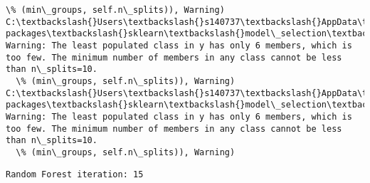 \documentclass[11pt]{article}
\begin{document}
\begin{Verbatim}[commandchars=\\\{\}]
  \% (min\_groups, self.n\_splits)), Warning)
C:\textbackslash{}Users\textbackslash{}s140737\textbackslash{}AppData\textbackslash{}Local\textbackslash{}Continuum\textbackslash{}anaconda3\textbackslash{}lib\textbackslash{}site-packages\textbackslash{}sklearn\textbackslash{}model\_selection\textbackslash{}\_split.py:605: Warning: The least populated class in y has only 6 members, which is too few. The minimum number of members in any class cannot be less than n\_splits=10.
  \% (min\_groups, self.n\_splits)), Warning)
C:\textbackslash{}Users\textbackslash{}s140737\textbackslash{}AppData\textbackslash{}Local\textbackslash{}Continuum\textbackslash{}anaconda3\textbackslash{}lib\textbackslash{}site-packages\textbackslash{}sklearn\textbackslash{}model\_selection\textbackslash{}\_split.py:605: Warning: The least populated class in y has only 6 members, which is too few. The minimum number of members in any class cannot be less than n\_splits=10.
  \% (min\_groups, self.n\_splits)), Warning)

    \end{Verbatim}

    \begin{Verbatim}[commandchars=\\\{\}]
Random Forest iteration: 15 

    \end{Verbatim}
\end{document}
